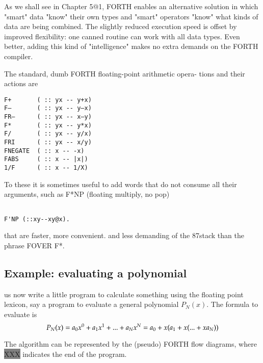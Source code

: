 As we shall see in Chapter 5@1, FORTH enables an alternative
solution in which "smart" data "know" their own types and
"smart" operators "know" what kinds of data are being combined.
The slightly reduced execution speed is offset by improved
ﬂexibility: one canned routine can work with all data types. Even
better, adding this kind of "intelligence" makes no extra demands
on the FORTH compiler.

The standard, dumb FORTH floating-point arithmetic opera-
tions and their actions are

\begin{verbatim}
F+       ( :: yx -- y+x)
F—       ( :: yx -- y—x)
FR—      ( :: yx -- x—y)
F*       ( :: yx -- y*x)
F/       ( :: yx -- y/x)
FRI      ( :: yx -- x/y)
FNEGATE  ( :: x -- -x)
FABS     ( :: x -- |x|)
1/F      ( :: x -- 1/X)
\end{verbatim}

To these it is sometimes useful to add words that do not consume
all their arguments, such as F*NP (floating multiply, no pop)

\begin{verbatim}

F'NP (::xy--xy@x).

\end{verbatim}

that are faster, more convenient. and less demanding of the
87stack than the phrase FOVER F*.

\subsection{Example: evaluating a polynomial}
 us now write a little program to calculate something using
the floating point lexicon, say a program to evaluate a general
polynomial $P_N (x)$. The formula to evaluate is
\begin{equation}
P_N(x)=a_0x^0+a_1x^1+...+a_Nx^N
\\
=a_0+x(a_1+x(... +xa_N))\nonumber
\end{equation}



The algorithm can be represented by the (pseudo) FORTH ﬂow
diagrams, where
{\colorbox{gray}{\color{gray}XXX}} indicates the end of the program.

